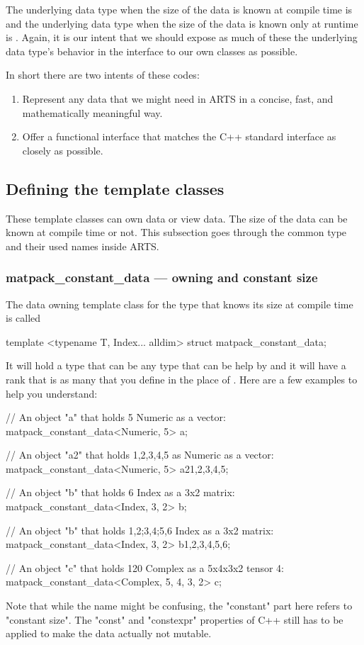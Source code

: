 The underlying data type when the size of the data is known at compile time is 
and the underlying data type when the size of the data is known only at runtime is .
Again, it is our intent that we should expose as much of these the underlying data type's behavior in the interface to our
own classes as possible.

In short there are two intents of these codes:
\begin{enumerate}
\item Represent any data that we might need in ARTS in a concise, fast, and mathematically meaningful way.
\item Offer a functional interface that matches the C++ standard interface as closely as possible.
\end{enumerate}

\subsection{Defining the template classes}
These template classes can own data or view data.  The size of the data can be known at compile time or not.
This subsection goes through the common type and their used names inside ARTS.

\subsubsection{matpack\_constant\_data --- owning and constant size}
The data owning template class for the type that knows its size at compile time is called
\begin{code}
template <typename T, Index... alldim>
struct matpack_constant_data;
\end{code}
It will hold a type  that can be any type that can be help by 
and it will have a rank  that is as many  that you define in the place
of .  Here are a few examples to help you understand:
\begin{code}
// An object "a" that holds 5 Numeric as a vector:
matpack_constant_data<Numeric, 5> a;

// An object "a2" that holds 1,2,3,4,5 as Numeric as a vector:
matpack_constant_data<Numeric, 5> a2{1,2,3,4,5};

// An object "b" that holds 6 Index as a 3x2 matrix:
matpack_constant_data<Index, 3, 2> b;

// An object "b" that holds 1,2;3,4;5,6 Index as a 3x2 matrix:
matpack_constant_data<Index, 3, 2> b{1,2,3,4,5,6};

// An object "c" that holds 120 Complex as a 5x4x3x2 tensor 4:
matpack_constant_data<Complex, 5, 4, 3, 2> c;
\end{code}
Note that while the name might be confusing, the "constant" part here refers to "constant size".  The
"const" and "constexpr" properties of C++ still has to be applied to make the data actually not mutable.

